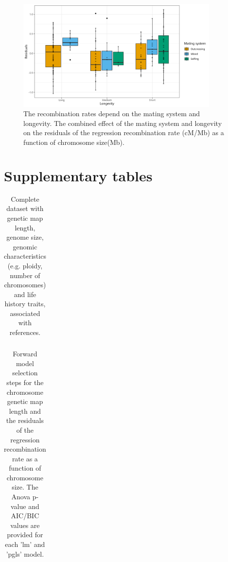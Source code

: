 \documentclass{article}
\begin{document}
\begin{figure}[h!]
  \includegraphics[width=0.9\textwidth]{figures/FigS5.jpeg}
  \centering
  \caption{The recombination rates depend on the mating system and longevity. The combined effect of the mating system and longevity on the residuals of the regression recombination rate (cM/Mb) as a function of chromosome size(Mb).
  }
  \label{figure:FigS5}
\end{figure}




\clearpage

\section*{Supplementary tables}

\renewcommand{\thetable}{S\arabic{table}}

\setcounter{table}{0}


\begin{table}[h!]
\centering{}
\caption{Complete dataset with genetic map length, genome size, genomic characteristics (e.g. ploidy, number of chromosomes) and life history traits, associated with references.}
\begin{tabular}{cccccccc}
\end{tabular}
\label{table:tableS1}
\end{table}


\begin{table}[h!]
\centering{}
\caption{Forward model selection steps for the chromosome genetic map length and the residuals of the regression recombination rate as a function of chromosome size. The Anova p-value and AIC/BIC values are provided for each 'lm' and 'pgls' model.}
\begin{tabular}{cccccccc}
\end{tabular}
\label{table:tableS2}
\end{table}
\end{document}
